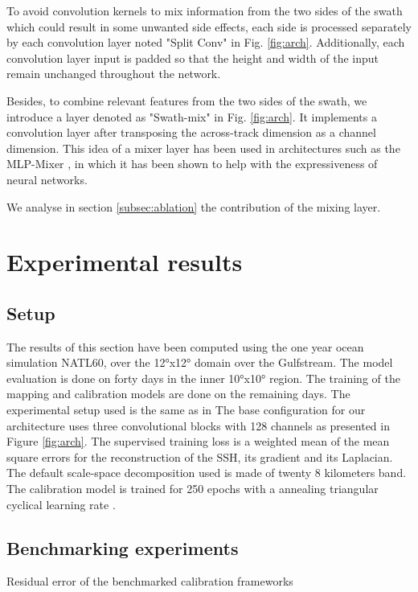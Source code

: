 \begin{bibunit}
To avoid convolution kernels to mix information from the two sides of the swath which could result in some unwanted side effects, each side is processed separately by each convolution layer noted "Split Conv" in Fig. \ref{fig:arch}. Additionally, each convolution layer input is padded so that the height and width of the input remain unchanged throughout the network.

Besides, to combine relevant features from the two sides of the swath, we introduce a layer denoted as "Swath-mix" in Fig. \ref{fig:arch}. It implements a convolution layer after transposing the across-track dimension as a channel dimension. This idea of a mixer layer has been used in architectures such as the MLP-Mixer \cite{mlpmixer}, in which it has been shown to help with the expressiveness of neural networks.


We analyse in section \ref{subsec:ablation} the contribution of the mixing layer.

\section{Experimental results}
\label{sec:results}

\subsection{Setup}
\noindent
The results of this section have been computed using the one year ocean simulation NATL60, over the 12°x12° domain over the Gulfstream. The model evaluation is done on forty days in the inner 10°x10° region. The training of the mapping and calibration models are done on the remaining days.
The experimental setup used is the same as in \cite{osse_data_challenge}
The base configuration for our architecture uses three convolutional blocks with 128 channels as presented in Figure \ref{fig:arch}.
The supervised training loss is a weighted mean of the mean square errors for the reconstruction of the SSH, its gradient and its Laplacian.
The default scale-space decomposition used is made of twenty 8 kilometers band.
The calibration model is trained for 250 epochs with a annealing triangular cyclical learning rate \cite{Smith_2017}.

\subsection{Benchmarking experiments}
\label{subsec:main_res}
\noindent

\begin{table}[t]
\begin{center}

\end{center}
\caption{Residual error of the benchmarked calibration frameworks}
\label{table:main}
\end{table}


\end{bibunit}
